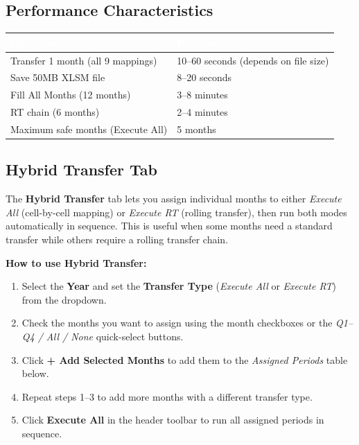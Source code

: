 \documentclass[11pt,a4paper]{article}
\begin{document}
\subsection{Performance Characteristics}

\begin{center}
\begin{tabularx}{0.88\linewidth}{@{} l X @{}}
\toprule
\rowcolor{PrimaryBlue}
\textcolor{White}{\textbf{Operation}} & \textcolor{White}{\textbf{Performance}} \\
\midrule
Transfer 1 month (all 9 mappings) & 10--60 seconds (depends on file size) \\
Save 50MB XLSM file               & 8--20 seconds \\
Fill All Months (12 months)       & 3--8 minutes \\
RT chain (6 months)               & 2--4 minutes \\
Maximum safe months (Execute All) & 5 months \\
\bottomrule
\end{tabularx}
\end{center}

\subsection{Hybrid Transfer Tab}

The \textbf{Hybrid Transfer} tab lets you assign individual months to either \textit{Execute All} (cell-by-cell mapping) or \textit{Execute RT} (rolling transfer), then run both modes automatically in sequence. This is useful when some months need a standard transfer while others require a rolling transfer chain.

\textbf{How to use Hybrid Transfer:}
\begin{enumerate}[leftmargin=*, itemsep=4pt]
  \item Select the \textbf{Year} and set the \textbf{Transfer Type} (\textit{Execute All} or \textit{Execute RT}) from the dropdown.
  \item Check the months you want to assign using the month checkboxes or the \textit{Q1--Q4 / All / None} quick-select buttons.
  \item Click \textbf{+ Add Selected Months} to add them to the \textit{Assigned Periods} table below.
  \item Repeat steps 1--3 to add more months with a different transfer type.
  \item Click \textbf{Execute All} in the header toolbar to run all assigned periods in sequence.
\end{enumerate}
\end{document}
